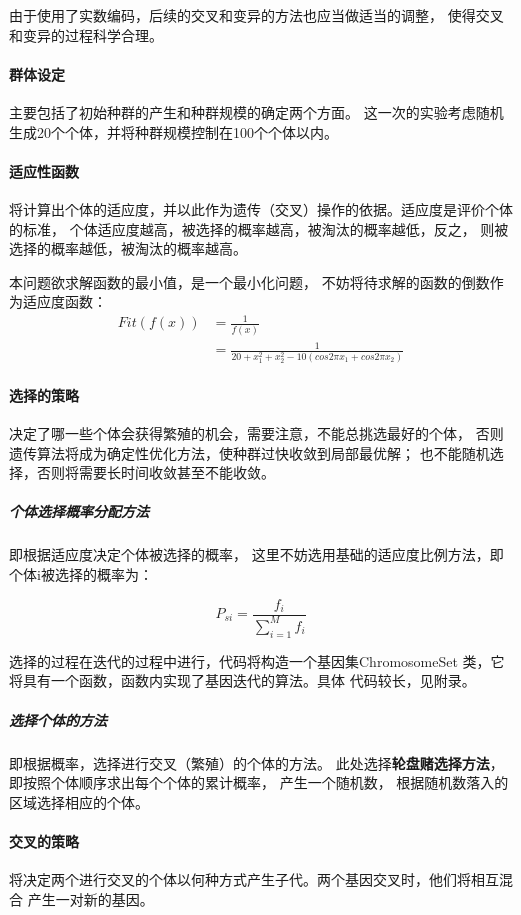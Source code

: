 \documentclass[UTF8]{ctexart}
\begin{document}
由于使用了实数编码，后续的交叉和变异的方法也应当做适当的调整，
使得交叉和变异的过程科学合理。

\paragraph{群体设定}
主要包括了初始种群的产生和种群规模的确定两个方面。
这一次的实验考虑随机生成20个个体，并将种群规模控制在100个个体以内。

\paragraph{适应性函数}
将计算出个体的适应度，并以此作为遗传（交叉）操作的依据。适应度是评价个体的标准，
个体适应度越高，被选择的概率越高，被淘汰的概率越低，反之，
则被选择的概率越低，被淘汰的概率越高。

本问题欲求解函数的最小值，是一个最小化问题，
不妨将待求解的函数的倒数作为适应度函数：
\[
\begin{aligned}
    Fit(f(x))& = \frac{1}{f(x)}\\
    & = \frac{1}{20 + x_1^2 + x_2^2 - 10 (cos 2 \pi x_1 + cos 2 \pi x_2)}
\end{aligned}
\]

\paragraph{选择的策略}
决定了哪一些个体会获得繁殖的机会，需要注意，不能总挑选最好的个体，
否则遗传算法将成为确定性优化方法，使种群过快收敛到局部最优解；
也不能随机选择，否则将需要长时间收敛甚至不能收敛。

\subparagraph{个体选择概率分配方法}即根据适应度决定个体被选择的概率，
这里不妨选用基础的适应度比例方法，即个体i被选择的概率为：

\[
    P_{si} = \frac{f_i}{\sum_{i = 1}^{M}f_i}
\]

选择的过程在迭代的过程中进行，代码将构造一个基因集ChromosomeSet
类，它将具有一个函数，函数内实现了基因迭代的算法。具体
代码较长，见附录。

\subparagraph{选择个体的方法}即根据概率，选择进行交叉（繁殖）的个体的方法。
此处选择\textbf{轮盘赌选择方法}，即按照个体顺序求出每个个体的累计概率，
产生一个随机数，
根据随机数落入的区域选择相应的个体。

\paragraph{交叉的策略}
将决定两个进行交叉的个体以何种方式产生子代。两个基因交叉时，他们将相互混合
产生一对新的基因。
\end{document}
